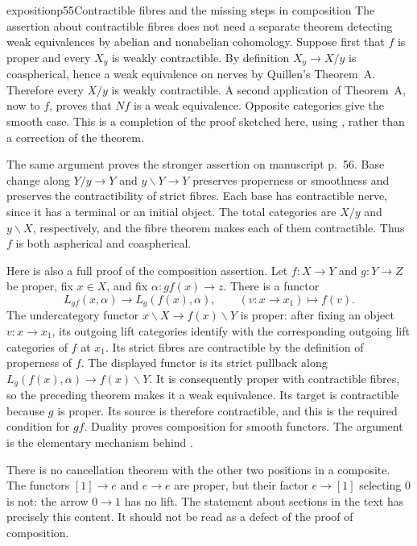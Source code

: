 \begin{dcomment}{exposition}{p55}{Contractible fibres and the missing steps in composition}
The assertion about contractible fibres does not need a separate theorem detecting weak equivalences by abelian and nonabelian cohomology. Suppose first that $f$ is proper and every $X_y$ is weakly contractible. By definition $X_y\to X/y$ is coaspherical, hence a weak equivalence on nerves by Quillen's Theorem~A. Therefore every $X/y$ is weakly contractible. A second application of Theorem~A, now to $f$, proves that $Nf$ is a weak equivalence. Opposite categories give the smooth case. This is a completion of the proof sketched here, using \citet[\S1, Theorem~A]{Quillen1973}, rather than a correction of the theorem.

The same argument proves the stronger assertion on manuscript p.~56. Base change along $Y/y\to Y$ and $y\backslash Y\to Y$ preserves properness or smoothness and preserves the contractibility of strict fibres. Each base has contractible nerve, since it has a terminal or an initial object. The total categories are $X/y$ and $y\backslash X$, respectively, and the fibre theorem makes each of them contractible. Thus $f$ is both aspherical and coaspherical.

Here is also a full proof of the composition assertion. Let $f:X\to Y$ and $g:Y\to Z$ be proper, fix $x\in X$, and fix $\alpha:gf(x)\to z$. There is a functor
\[
 L_{gf}(x,\alpha)\longrightarrow L_g(f(x),\alpha),
 \qquad (v:x\to x_1)\longmapsto f(v).
\]
The undercategory functor $x\backslash X\to f(x)\backslash Y$ is proper: after fixing an object $v:x\to x_1$, its outgoing lift categories identify with the corresponding outgoing lift categories of $f$ at $x_1$. Its strict fibres are contractible by the definition of properness of $f$. The displayed functor is its strict pullback along $L_g(f(x),\alpha)\to f(x)\backslash Y$. It is consequently proper with contractible fibres, so the preceding theorem makes it a weak equivalence. Its target is contractible because $g$ is proper. Its source is therefore contractible, and this is the required condition for $gf$. Duality proves composition for smooth functors. The argument is the elementary mechanism behind \citet[Propositions~3.2.6 and~3.2.10]{Maltsiniotis2020}.

There is no cancellation theorem with the other two positions in a composite. The functors $[1]\to e$ and $e\to e$ are proper, but their factor $e\to[1]$ selecting $0$ is not: the arrow $0\to1$ has no lift. The statement about sections in the text has precisely this content. It should not be read as a defect of the proof of composition.
\end{dcomment}

